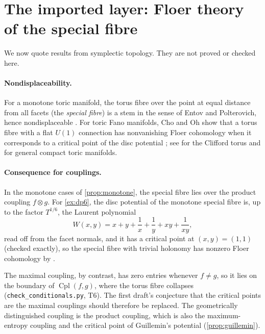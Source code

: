 \documentclass[11pt]{article}
\theoremstyle{definition}
\theoremstyle{remark}
\newcommand{\Cpl}{\operatorname{Cpl}}
\begin{document}
\section{The imported layer: Floer theory of the special fibre}\label{sec:imported}

We now quote results from symplectic topology. They are not proved or checked here.

\paragraph{Nondisplaceability.} For a monotone toric manifold, the torus fibre over the point at equal
distance from all facets (the \emph{special fibre}) is a stem in the sense of Entov and Polterovich,
hence nondisplaceable \cite{EntovPolterovich2006}. For toric Fano manifolds, Cho and Oh show that a
torus fibre with a flat $U(1)$ connection has nonvanishing Floer cohomology when it corresponds to a
critical point of the disc potential \cite{ChoOh2006}; see \cite{Cho2004} for the Clifford torus and
\cite{FOOO2010} for general compact toric manifolds.

\paragraph{Consequence for couplings.} In the monotone cases of \cref{prop:monotone}, the special fibre
lies over the product coupling $f\otimes g$. For \cref{ex:dp6}, the disc potential of the monotone
special fibre is, up to the factor $T^{1/6}$, the Laurent polynomial
\[
W(x,y)=x+y+\frac1x+\frac1y+xy+\frac1{xy},
\]
read off from the facet normals, and it has a critical point at $(x,y)=(1,1)$ (checked exactly), so the
special fibre with trivial holonomy has nonzero Floer cohomology by \cite{ChoOh2006}.

The maximal coupling, by contrast, has zero entries whenever $f\ne g$, so it lies on the boundary of
$\Cpl(f,g)$, where the torus fibre collapses (\texttt{check\_conditionals.py}, T6). The first draft's
conjecture that the critical points are the maximal couplings should therefore be replaced. The
geometrically distinguished coupling is the product coupling, which is also the maximum-entropy
coupling and the critical point of Guillemin's potential (\cref{prop:guillemin}).

\end{document}
